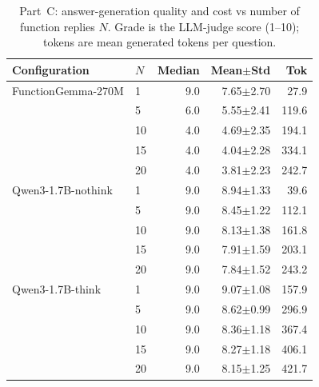 \begin{table}[H]
\centering
\caption{Part~C: answer-generation quality and cost vs number of function replies $N$. Grade is the LLM-judge score (1--10); tokens are mean generated tokens per question.}
\label{tab:partC}
\begin{tabular}{llrrr}
\toprule
Configuration & $N$ & Median & Mean$\pm$Std & Tok \\
\midrule
FunctionGemma-270M & 1 & 9.0 & 7.65$\pm$2.70 & 27.9 \\
 & 5 & 6.0 & 5.55$\pm$2.41 & 119.6 \\
 & 10 & 4.0 & 4.69$\pm$2.35 & 194.1 \\
 & 15 & 4.0 & 4.04$\pm$2.28 & 334.1 \\
 & 20 & 4.0 & 3.81$\pm$2.23 & 242.7 \\
\midrule
Qwen3-1.7B-nothink & 1 & 9.0 & 8.94$\pm$1.33 & 39.6 \\
 & 5 & 9.0 & 8.45$\pm$1.22 & 112.1 \\
 & 10 & 9.0 & 8.13$\pm$1.38 & 161.8 \\
 & 15 & 9.0 & 7.91$\pm$1.59 & 203.1 \\
 & 20 & 9.0 & 7.84$\pm$1.52 & 243.2 \\
\midrule
Qwen3-1.7B-think & 1 & 9.0 & 9.07$\pm$1.08 & 157.9 \\
 & 5 & 9.0 & 8.62$\pm$0.99 & 296.9 \\
 & 10 & 9.0 & 8.36$\pm$1.18 & 367.4 \\
 & 15 & 9.0 & 8.27$\pm$1.18 & 406.1 \\
 & 20 & 9.0 & 8.15$\pm$1.25 & 421.7 \\
\bottomrule
\end{tabular}
\end{table}
